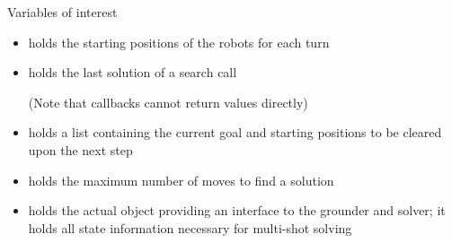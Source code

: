 \begin{frame}{Variables of interest}
  \small\bigskip
  \begin{itemize}
  \item<2-> 
    holds the starting positions of the robots for each turn
    \smallskip
  \item<3-> 
    holds the last solution of a search call
    \par
    (Note that callbacks cannot return values directly)
    \smallskip
  \item<4-> 
    holds a list containing the current goal and starting positions
    to be cleared upon the next step
    \smallskip
  \item<5-> 
    holds the maximum number of moves to find a solution
    \smallskip
  \item<6-> 
    holds the actual object providing an interface to the grounder and solver;
    it holds all state information necessary for multi-shot solving
  \end{itemize}
\end{frame}
